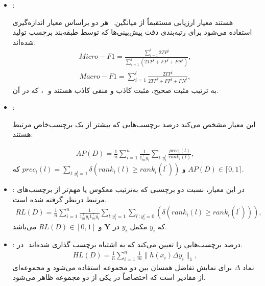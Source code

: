 \begin{itemize}
	
	\item	{} :
	
	هر دو براساس معیار اندازه‌گیری ‎ ‎.هستند معیار ارزیابی مستقیماً از میانگین‌‌‌ ‎ استفاده می‌شود برای رتبه‌بندی دقت پیش‌بینی‌ها که توسط طبقه‌بند برچسب تولید شده‌اند.
	\begin{align}
		{Micro-F1} = \frac{\sum_{i=1}^{l} 2 TP^i}{\sum_{i=1}^{l}(2 TP^i + FP^i + FN^i)},
	\end{align}
	\begin{align}
		{Macro-F1} = \sum_{i=1}^{l} \frac{2 TP^i}{2 TP^i + FP^i + FN^i},
	\end{align}
	که در آن ‎، ‎‎ و ‎‎به ترتیب مثبت صحیح، مثبت کاذب و منفی کاذب هستند.
	
	\item {}:
	
	
	این معیار مشخص می‌کند درصد برچسب‌هایی که بیشتر از یک برچسب‌خاص مرتبط هستند:
	
	\begin{align}
		{AP(D)} = \frac{1}{n} \sum_{i=1}^{n} \frac{1}{1^\top_m y_i} \sum_{l:y^l_i}^{}\frac{prec_i(l)}{rank_i(l)},
	\end{align}
	که‎
	$prec_i(l)=\sum_{l:y^l_i=1}^{} \delta(rank_i(l) \geq rank_i(l^\prime))$ و $AP(D) \in \lceil 0,1 \rceil $.
	
	\item	{}:
	در این معیار، نسبت دو برچسبی که به‌ترتیب معکوس یا مهم‌تر از برچسب‌های مرتبط درنظر گرفته شده است.
	\begin{align}
		{RL(D)} = \frac{1}{n} \sum_{i=1}^{n} \frac{1}{1^\top_m y_i 1^\top_m \overline{y_i}} \sum_{l:y^l_i=1}^{}\sum_{l^\prime:y^l_i=0}^{}(\delta(rank_i(l) \geq rank_i(l^\prime))),
	\end{align}
	که 
	$\overline{y_i}$ 
	مکمل
	$y_i$ در $\bm{Y}$ و $‎RL(D) \in [0, 1]$
	می‌باشد.
	\item	{}:
	در ‎ درصد برچسب‌هایی را تعیین می‌کند که به اشتباه برچسب‌ گذاری شده‌اند.
	\begin{align}
		{HL(D)} = \frac{1}{n} \sum_{i=1}^{n} \frac{1}{m} \lVert h(x_i) \Delta y_i \lVert_1,
	\end{align}
	نماد $\Delta$ برای نمایش تفاضل همسان بین دو مجموعه استفاده می‌شود و مجموعه‌ای از مقادیر است که اختصاصاً در یکی از دو مجموعه ظاهر می‌شود.
	

\end{itemize}
